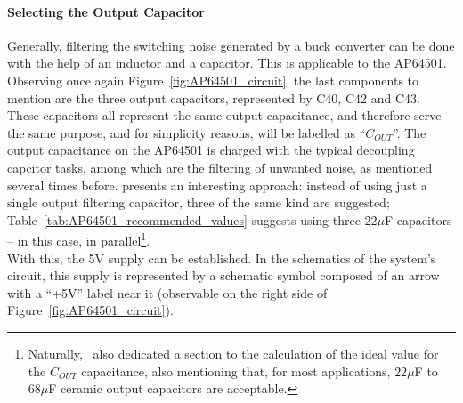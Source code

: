 \paragraph{Selecting the Output Capacitor}	Generally, filtering the switching noise generated by a buck converter can be done with the help of an inductor and a capacitor.
This is applicable to the AP64501.
Observing once again Figure~\ref{fig:AP64501_circuit}, the last components to mention are the three output capacitors, represented by C40, C42 and C43. These capacitors all represent the same output capacitance, and therefore serve the same purpose, and for simplicity reasons, will be labelled as ``$C_{OUT}$''. The output capacitance on the AP64501 is charged with the typical decoupling capcitor tasks, among which are the filtering of unwanted noise, as mentioned several times before.
\cite{AP64501} presents an interesting approach: instead of using just a single output filtering capacitor, three of the same kind are suggested; Table~\ref{tab:AP64501_recommended_values} suggests using three $22 \mu$F capacitors -- in this case, in parallel\footnote[13]{Naturally,~\cite{AP64501} also dedicated a section to the calculation of the ideal value for the $C_{OUT}$ capacitance, also mentioning that, for most applications, $22 \mu$F to $68 \mu$F ceramic output capacitors are acceptable.}.\\

With this, the 5V supply can be established. In the schematics of the system's circuit, this supply is represented by a schematic symbol composed of an arrow with a ``+5V'' label near it (observable on the right side of Figure~\ref{fig:AP64501_circuit}).





